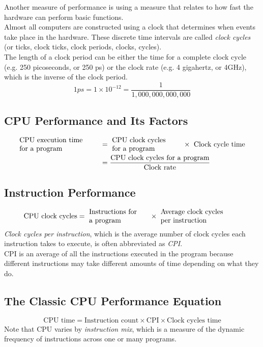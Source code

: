 \documentclass[12pt]{article}
\theoremstyle{definition}
\begin{document}
  Another measure of performance is using a measure that relates to how fast the hardware can perform basic functions. \\
  Almost all computers are constructed using a clock that determines when events take place in the hardware.
  These discrete time intervals are called \emph{clock cycles} (or ticks, clock ticks, clock periods, clocks, cycles). \\
  The length of a clock period can be either the time for a complete clock cycle (e.g. 250 picoseconds, or 250 ps) or the clock rate (e.g. 4 gigahertz, or 4GHz), which is the inverse of the clock period.
  $$1ps = 1 \times 10^{-12} = \frac{1}{1,000,000,000,000}$$

  \subsection{CPU Performance and Its Factors}
  \begin{align*}
  \parbox{4cm}{CPU execution time\\for a program}
  &= ~\parbox{3.5cm}{CPU clock cycles\\for a program} \times \text{ Clock cycle time} \\
  &= \frac{\text{CPU clock cycles for a program}}{\text{Clock rate}}
  \end{align*}

  \subsection{Instruction Performance}
  $$\text{CPU clock cycles} = ~\parbox{3cm}{Instructions for\\a program} \times ~\parbox{4cm}{Average clock cycles\\per instruction}$$
  \emph{Clock cycles per instruction}, which is the average number of clock cycles each instruction takes to execute, is often abbreviated as \emph{CPI}. \\
  CPI is an average of all the instructions executed in the program because different instructions may take different amounts of time depending on what they do.

  \subsection{The Classic CPU Performance Equation}
  $$\text{CPU time} = \text{Instruction count} \times \text{CPI} \times \text{Clock cycles time}$$
  Note that CPU varies by \emph{instruction mix}, which is a measure of the dynamic frequency of instructions across one or many programs.
\end{document}
